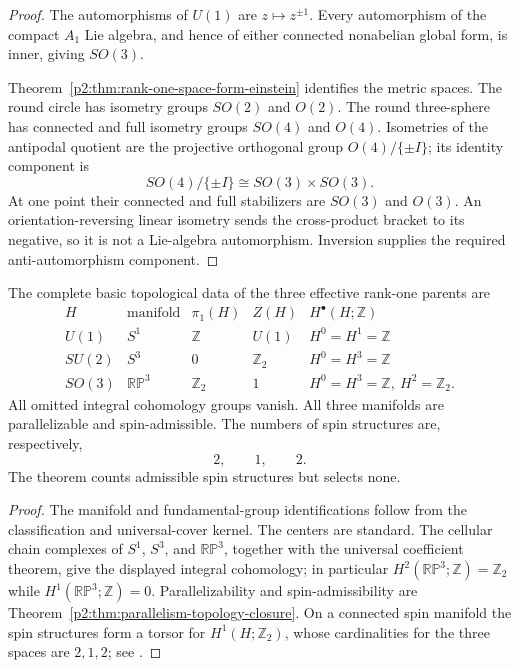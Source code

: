 \documentclass[11pt,a4paper]{article}
\begin{document}
\begin{proof}
The automorphisms of \(U(1)\) are \(z\mapsto z^{\pm1}\).  Every automorphism
of the compact \(A_1\) Lie algebra, and hence of either connected nonabelian
global form, is inner, giving \(SO(3)\).

Theorem~\ref{p2:thm:rank-one-space-form-einstein} identifies the metric
spaces.  The round circle has isometry groups \(SO(2)\) and \(O(2)\).
The round three-sphere has connected and full isometry groups \(SO(4)\) and
\(O(4)\).  Isometries of the antipodal quotient are the projective orthogonal
group \(O(4)/\{\pm I\}\); its identity component is
\[
 SO(4)/\{\pm I\}\cong SO(3)\times SO(3).
\]
At one point their connected and full stabilizers are \(SO(3)\) and \(O(3)\).
An orientation-reversing linear isometry sends the cross-product bracket to
its negative, so it is not a Lie-algebra automorphism.  Inversion supplies the
required anti-automorphism component.
\end{proof}

\begin{theorem}
\label{p2:thm:rank-one-topology-spin}
The complete basic topological data of the three effective rank-one parents
are
\[
\begin{array}{c|c|c|c|c}
H&\text{manifold}&\pi_1(H)&Z(H)&H^\bullet(H;\mathbb Z)\\ \hline
U(1)&S^1&\mathbb Z&U(1)&H^0=H^1=\mathbb Z\\
SU(2)&S^3&0&\mathbb Z_2&H^0=H^3=\mathbb Z\\
SO(3)&\mathbb{RP}^3&\mathbb Z_2&1&
H^0=H^3=\mathbb Z,\ H^2=\mathbb Z_2 .
\end{array}
\]
All omitted integral cohomology groups vanish.  All three manifolds are
parallelizable and spin-admissible.  The numbers of spin structures are,
respectively,
\[
 2,\qquad 1,\qquad 2.
\]
The theorem counts admissible spin structures but selects none.
\end{theorem}

\begin{proof}
The manifold and fundamental-group identifications follow from the
classification and universal-cover kernel.  The centers are standard.
The cellular chain complexes of \(S^1\), \(S^3\), and
\(\mathbb{RP}^3\), together with the universal coefficient theorem, give the
displayed integral cohomology; in particular
\(H^2(\mathbb{RP}^3;\mathbb Z)=\mathbb Z_2\) while
\(H^1(\mathbb{RP}^3;\mathbb Z)=0\).  Parallelizability and spin-admissibility
are Theorem~\ref{p2:thm:parallelism-topology-closure}.  On a connected spin
manifold the spin structures form a torsor for \(H^1(H;\mathbb Z_2)\), whose
cardinalities for the three spaces are \(2,1,2\); see
\cite{hatcher2002algebraic,lawson1989spin}.
\end{proof}
\end{document}
